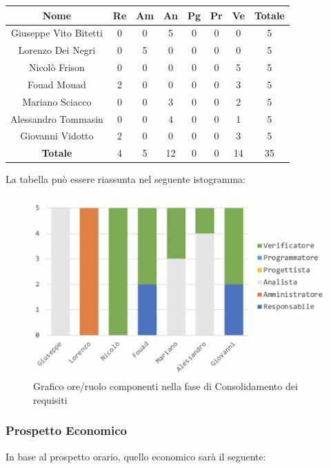 			\begin{longtable}{|c|c|c|c|c|c|c|c}
				\hline
				\rowcolor{lighter-grayer}
				\textbf{Nome} & \textbf{Re} & \textbf{Am} & \textbf{An} & \textbf{Pg}  & \textbf{Pr}   & \textbf{Ve} & \textbf{Totale} \\
				\hline
				\endfirsthead
				
				\hline
				Giuseppe Vito Bitetti & 0 & 0 & 5 & 0 & 0 & 0 & 5\\
				\hline
				\hline
				Lorenzo Dei Negri & 0 & 5 & 0 & 0 & 0 & 0 & 5\\
				\hline
				\hline
				Nicolò Frison & 0 & 0 & 0 & 0 & 0 & 5 & 5\\
				\hline
				\hline
				Fouad Mouad & 2 & 0 & 0 & 0 & 0 & 3 & 5\\
				\hline
				\hline
				Mariano Sciacco & 0 & 0 & 3 & 0 & 0 & 2 & 5\\
				\hline
				\hline
				Alessandro Tommasin & 0 & 0 & 4 & 0 & 0 & 1 & 5\\
				\hline
				\hline
				Giovanni Vidotto & 2 & 0 & 0 & 0 & 0 & 3 & 5\\
				\hline 
				\textbf{Totale} & 4 &  5 & 12 & 0 & 0 & 14 & 35\\
				\hline
			\end{longtable}
			\pagebreak
		
			La tabella può essere riassunta nel seguente istogramma:
			\begin{figure}[H]
				\centering
				\includegraphics[width=0.8\linewidth]{./images/consRequisiti1.png}
				\caption{Grafico ore/ruolo componenti nella fase di Consolidamento dei requisiti}
				\label{fig:grafico suddivione ruoli fase Consolidamento requisiti}
			\end{figure}
		
		\subsubsection{Prospetto Economico}
		In base al prospetto orario, quello economico sarà il seguente: 
		
